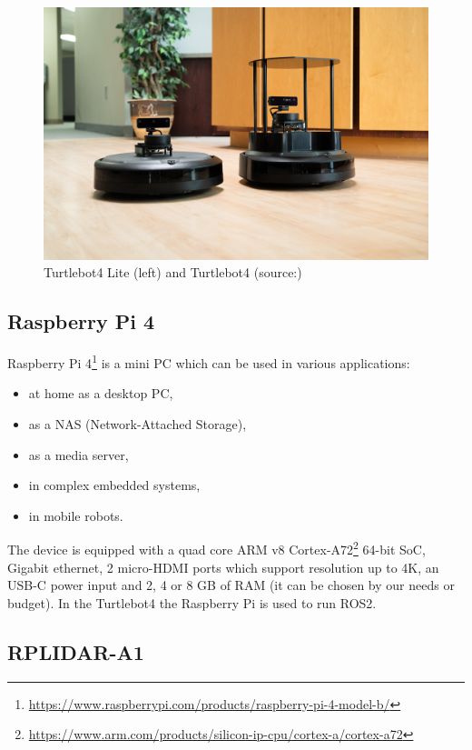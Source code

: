 \begin{figure}[H]
    \centering
    \includegraphics[width=150mm, keepaspectratio]{figures/TurtleBot4.jpg}
    \caption{Turtlebot4 Lite (left) and Turtlebot4 (source:\cite{Turtlebot4Pic})}
    \label{fig:turtlebot4}
\end{figure}

\subsection{Raspberry Pi 4}

Raspberry Pi 4\footnote{\url{https://www.raspberrypi.com/products/raspberry-pi-4-model-b/}} is a mini PC which can be used in various applications:
\begin{itemize}
    \item at home as a desktop PC,
    \item as a NAS (Network-Attached Storage),
    \item as a media server,
    \item in complex embedded systems,
    \item in mobile robots.
\end{itemize}
The device is equipped with a quad core ARM v8 Cortex-A72\footnote{\url{https://www.arm.com/products/silicon-ip-cpu/cortex-a/cortex-a72}} 64-bit SoC, Gigabit ethernet, 2 micro-HDMI ports which support resolution up to 4K, an USB-C power input and 2, 4 or 8 GB of RAM (it can be chosen by our needs or budget). In the Turtlebot4 the Raspberry Pi is used to run ROS2.


\subsection{RPLIDAR-A1}

